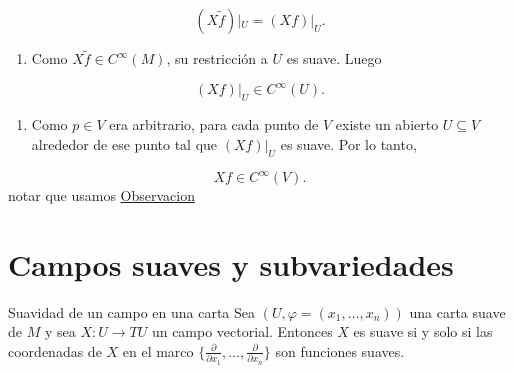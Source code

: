 \begin{bookproof}{}
\[
(X\widetilde f)|_U=(Xf)|_U.
\]
\begin{enumerate}[start=7]
\item Como $X\widetilde f\in C^\infty(M)$, su restricción a $U$ es suave. Luego
\end{enumerate}
\[
(Xf)|_U\in C^\infty(U).
\]
\begin{enumerate}[start=8]
\item Como $p\in V$ era arbitrario, para cada punto de $V$ existe un abierto $U\subseteq V$ alrededor de ese punto tal que $(Xf)|_U$ es suave. Por lo tanto,
\end{enumerate}
\[
Xf\in C^\infty(V).
\]
notar que usamos \hyperref[blk:e32b2f]{Observacion}

\bookqed
\end{bookproof}
\section{Campos suaves y subvariedades}
\begin{bookproposition}{Suavidad de un campo en una carta}
Sea $(U,\varphi=(x_1,\ldots,x_n))$ una carta suave de $M$ y sea $X:U \to TU$ un campo vectorial. Entonces $X$ es suave si y solo si las coordenadas de $X$ en el marco $\{\frac{\partial}{\partial x_1},\ldots,\frac{\partial}{\partial x_n}\}$ son funciones suaves.

\end{bookproposition}
